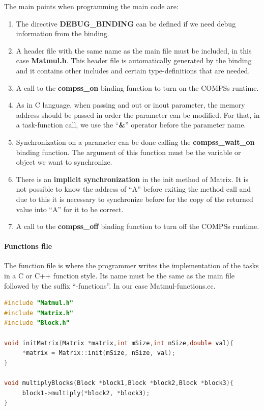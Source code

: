 The main points when programming the main code are:
\begin{enumerate}
 \item The directive {\bf DEBUG\_BINDING} can be defined if we need debug information from the binding.
 \item A header file with the same name as the main file must be included, in this case {\bf Matmul.h}. This header file is automatically generated by the binding and it contains other includes and certain type-definitions that are needed.
 \item A call to the {\bf compss\_on} binding function to turn on the COMPSs runtime.
 \item As in C language, when passing and out or inout parameter, the memory address should be passed in order the parameter can be modified. For that, in a task-function call, we use the ``{\bf \&}'' operator before the parameter name.
 \item Synchronization on a parameter can be done calling the {\bf compss\_wait\_on} binding function. The argument of this function must be the variable or object we want to synchronize.
 \item There is an {\bf implicit synchronization} in the init method of Matrix. It is not possible to know the address of ``A'' before exiting the method call and due to this it is necessary to synchronize before for the copy of the returned value into ``A'' for it to be correct.
 \item A call to the {\bf compss\_off} binding function to turn off the COMPSs runtime.
\end{enumerate}


\paragraph{Functions file}
The function file is where the programmer writes the implementation of the tasks in a C or C++ function style. Its name must be the same as the main file followed by the suffix ``-functions''. In our case Matmul-functions.cc.

\begin{lstlisting}[language=C++]
#include "Matmul.h"
#include "Matrix.h"
#include "Block.h"

void initMatrix(Matrix *matrix,int mSize,int nSize,double val){
     *matrix = Matrix::init(mSize, nSize, val);
}

void multiplyBlocks(Block *block1,Block *block2,Block *block3){
     block1->multiply(*block2, *block3);
}
\end{lstlisting}

